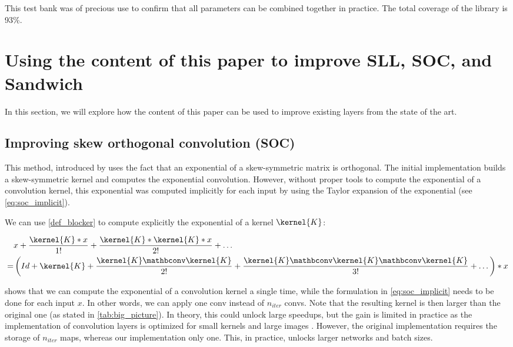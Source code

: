     This test bank was of precious use to confirm that all parameters can be combined together in practice. The total coverage of the library is 93\%.


\section{Using the content of this paper to improve SLL, SOC, and Sandwich}\label{sec:ap_improving_existing}

    In this section, we will explore how the content of this paper can be used to improve existing layers from the state of the art. %
    
    \subsection{Improving skew orthogonal convolution (SOC)} This method, introduced by \cite{singla_improved_2022} uses the fact that an exponential of a skew-symmetric matrix is orthogonal. The initial implementation builds a skew-symmetric kernel and computes the exponential convolution. However, without proper tools to compute the exponential of a convolution kernel, this exponential was computed implicitly for each input by using the Taylor expansion of the exponential (see \cref{eq:soc_implicit}).

        \begin{theorem}

            We can use \cref{def_blocker} to compute explicitly the exponential of a kernel $\kernel{K}$:

            \begin{align}
                & x + \frac{\kernel{K}*x}{1!} + \frac{\kernel{K}*\kernel{K}*x}{2!} + \dots \label{eq:soc_implicit} \\
                = & \left(Id + \kernel{K} + \frac{\kernel{K} \mathbconv \kernel{K}}{2!} + \frac{\kernel{K} \mathbconv \kernel{K} \mathbconv \kernel{K} }{3!} + \dots \right) * x \label{eq:soc_explicit}            
            \end{align}
        \end{theorem}

          shows that we can compute the exponential of a convolution kernel a single time, while the formulation in \cref{eq:soc_implicit} needs to be done for each input $x$. In other words, we can apply one conv instead of $n_{iter}$ convs. Note that the resulting kernel is then larger than the original one (as stated in  \cref{tab:big_picture}). In theory, this could unlock large speedups, but the gain is limited in practice as the implementation of convolution layers is optimized for small kernels and large images \cite{ding_scaling_2022}. However, the original implementation requires the storage of $n_{iter}$ maps, whereas our implementation only one. This, in practice, unlocks larger networks and batch sizes.

